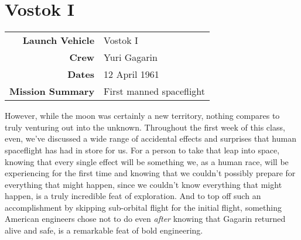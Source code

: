 \documentclass{article}
\begin{document}

  \section{Vostok I}

  \begin{center}
    \begin{tabular}{ >{\bfseries}r | p{3.5in} }
      \hline
      Launch Vehicle & Vostok I \\
      Crew & Yuri Gagarin \\
      Dates & 12 April 1961 \\
      Mission Summary & First manned spaceflight \\
      \hline
    \end{tabular}
  \end{center}

  However, while the moon was certainly a new territory, nothing compares to truly
  venturing out into the unknown. Throughout the first week of this class, even,
  we've discussed a wide range of accidental effects and surprises that human
  spaceflight has had in store for us. For a person to take that leap into space,
  knowing that every single effect will be something we, as a human race, will be
  experiencing for the first time and knowing that we couldn't possibly prepare
  for everything that might happen, since we couldn't know everything that might
  happen, is a truly incredible feat of exploration. And to top off such an
  accomplishment by skipping sub-orbital flight for the initial flight, something
  American engineers chose not to do even \textit{after} knowing that Gagarin returned
  alive and safe, is a remarkable feat of bold engineering.

\end{document}
